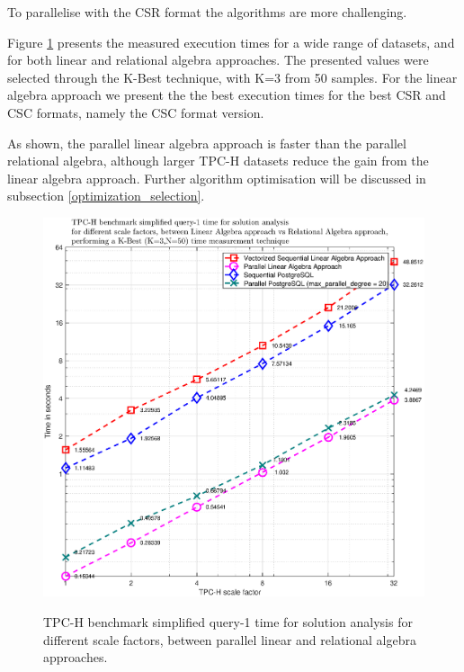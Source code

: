 To parallelise with the CSR format the algorithms are more challenging. \par 

Figure \ref{fig:time_la_vs_ra_parallel} presents the measured execution times for a wide range of datasets, and for both linear and relational algebra approaches. The presented values were selected through the K-Best technique, with K=3 from 50 samples. For the linear algebra approach we present the the best execution times for the best CSR and CSC formats, namely the CSC format version.\par

As shown, the parallel linear algebra approach is faster than the parallel relational algebra, although larger TPC-H datasets reduce the gain from the linear algebra approach. Further algorithm optimisation will be discussed in  subsection \ref{optimization_selection}.\par 

\begin{figure}[H]
\centering
\caption{TPC-H benchmark simplified query-1 time for solution analysis for different scale factors, between parallel linear and relational algebra approaches.}
\includegraphics[width=1\columnwidth]{eps/TIME_LA_vs_RA_parallel.eps}
\label{fig:time_la_vs_ra_parallel}
\end{figure}

